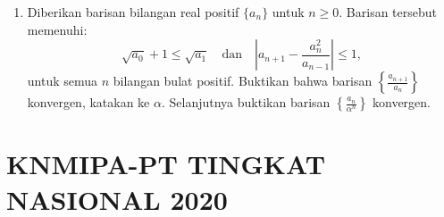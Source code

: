 \documentclass[12pt,twoside]{article}
\begin{document}
\begin{enumerate}
    \item Diberikan barisan bilangan real positif $\{a_n\}$ untuk $n \geq 0$. Barisan tersebut memenuhi:
          \[
              \sqrt{a_0} + 1 \leq \sqrt{a_1} \quad \text{dan} \quad \left| a_{n+1} - \frac{a_n^2}{a_{n-1}} \right| \leq 1,
          \]
          untuk semua $n$ bilangan bulat positif. Buktikan bahwa barisan $\left\{ \frac{a_{n+1}}{a_n} \right\}$ konvergen, katakan ke $\alpha$. Selanjutnya buktikan barisan $\left\{ \frac{a_n}{\alpha^n}\right\}$ konvergen.
\end{enumerate}

\pagebreak

\section{KNMIPA-PT TINGKAT NASIONAL 2020}
\end{document}
